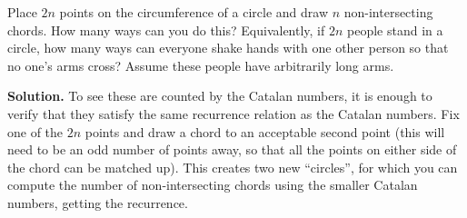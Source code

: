 \documentclass{book}
\begin{document}
\setcounter{project}{190}
\addtocounter{project}{-1}
\begin{activity}[]\label{activity-183}
\hypertarget{p-1116}{}%
Place \(2n\) points on the circumference of a circle and draw \(n\)  non-intersecting chords.  How many ways can you do this?  Equivalently, if \(2n\) people stand in a circle, how many ways can everyone shake hands with one other person so that no one's arms cross?  Assume these people have arbitrarily long arms.%
\par\smallskip%
\noindent\textbf{Solution.}\hypertarget{solution-121}{}\quad%
\hypertarget{p-1117}{}%
To see these are counted by the Catalan numbers, it is enough to verify that they satisfy the same recurrence relation as the Catalan numbers.  Fix one of the \(2n\) points and draw a chord to an acceptable second point (this will need to be an odd number of points away, so that all the points on either side of the chord can be matched up).  This creates two new ``circles'', for which you can compute the number of non-intersecting chords using the smaller Catalan numbers, getting the recurrence.%
\end{activity}
\end{document}
